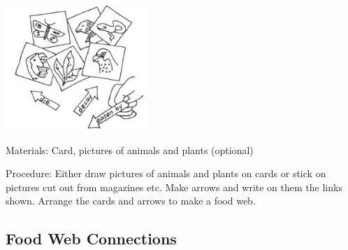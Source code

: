 \begin{multicols}{2}
\begin{center}
\includegraphics[width=0.4\textwidth]{./img/vso/food-webs.jpg}
\end{center}

\begin{description*}
\item[Materials:]{Card, pictures of animals and plants (optional)}
\item[Procedure:]{Either draw pictures of animals
and plants on cards or stick on
pictures cut out from magazines
etc. Make arrows and write on
them the links shown. Arrange
the cards and arrows to make a
food web.}
\end{description*}

\columnbreak

\subsection{Food Web Connections} %



\end{multicols}
